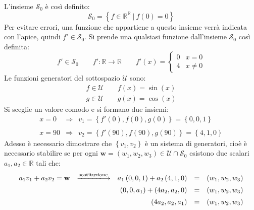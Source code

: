 \documentclass[a4paper]{article}
\begin{document}
	\noindent
	L'insieme $\mathscr{S}_{0}$ è così definito:
	\begin{equation*}
		\mathscr{S}_{0} = \left\{f \in \mathbb{R^{R}} \: | \: f\left(0\right) = 0\right\}
	\end{equation*}
	Per evitare errori, una funzione che appartiene a questo insieme verrà indicata con l'apice, quindi $f'\in \mathscr{S}_{0}$. Si prende una qualsiasi funzione dall'insieme $\mathscr{S}_{0}$ così definita:
	\begin{equation*}
		f' \in \mathscr{S}_{0} \hspace{2em} f':\mathbb{R} \rightarrow \mathbb{R} \hspace{2em} f'\left(x\right) = \begin{cases}
			0 & x = 0 \\
			4 & x \ne 0
		\end{cases}
	\end{equation*}
	Le funzioni generatori del sottospazio $\mathscr{U}$ sono:
	\begin{equation*}
		\begin{array}{l}
			f \in \mathscr{U} \hspace{2em} f\left(x\right) = \sin\left(x\right) \\ [0.5em]
			g \in \mathscr{U} \hspace{2em} g\left(x\right) = \cos\left(x\right)
		\end{array}
	\end{equation*}
	Si sceglie un valore comodo e si formano due insiemi:
	\begin{equation*}
		\begin{array}{lll}
			x = 0 & \Rightarrow & v_{1} = \left\{f'\left(0\right), f\left(0\right), g\left(0\right)\right\} = \left\{0, 0, 1\right\} \\
			\\
			x = 90 & \Rightarrow & v_{2} = \left\{f'\left(90\right), f\left(90\right), g\left(90\right)\right\} = \left\{4, 1, 0\right\}
		\end{array}
	\end{equation*}
	Adesso è necessario dimostrare che $\left\{v_{1}, v_{2}\right\}$ è un sistema di generatori, cioè è necessario stabilire se per ogni $\mathbf{w} = \left(w_{1}, w_{2}, w_{3}\right) \in \mathscr{U} \cap \mathscr{S}_{0}$ esistono due scalari $a_ {1}, a_{2} \in \mathbb{R}$ tali che:
	\begin{equation*}
		\begin{array}{llrll}
			a_{1}v_{1} + a_{2}v_{2} = \mathbf{w} & \xlongrightarrow{\text{sostituzione}} & a_{1}\left(0,0,1\right) + a_{2}\left(4,1,0\right) &=& \left(w_{1}, w_{2}, w_{3}\right) \\ [0.5em]
			&& \left(0,0,a_{1}\right) + \left(4a_{2}, a_{2}, 0\right) &=& \left(w_{1}, w_{2}, w_{3}\right) \\ [0.5em]
			&& \left(4a_{2}, a_{2}, a_{1}\right) &=& \left(w_{1}, w_{2}, w_{3}\right)
		\end{array}
	\end{equation*}
\end{document}
